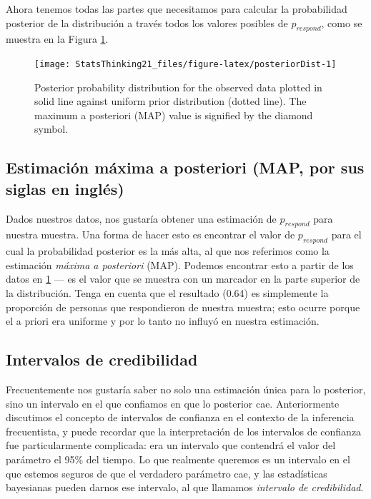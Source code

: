 \documentclass[
  12pt,
]{book}
\theoremstyle{definition}
\theoremstyle{definition}
\theoremstyle{definition}
\theoremstyle{remark}
\begin{document}
Ahora tenemos todas las partes que necesitamos para calcular la probabilidad posterior de la distribución a través todos los valores posibles de \(p_{respond}\), como se muestra en la Figura \ref{fig:posteriorDist}.

\begin{figure}
\texttt{[image: StatsThinking21\_files/figure-latex/posteriorDist-1]} \caption{Posterior probability distribution for the observed data plotted in solid line against uniform prior distribution (dotted line). The maximum a posteriori (MAP) value is signified by the diamond symbol.}\label{fig:posteriorDist}
\end{figure}

\hypertarget{estimaciuxf3n-muxe1xima-a-posteriori-map-por-sus-siglas-en-ingluxe9s}{%
\subsection{Estimación máxima a posteriori (MAP, por sus siglas en inglés)}\label{estimaciuxf3n-muxe1xima-a-posteriori-map-por-sus-siglas-en-ingluxe9s}}

Dados nuestros datos, nos gustaría obtener una estimación de \(p_{respond}\) para nuestra muestra. Una forma de hacer esto es encontrar el valor de \(p_{respond}\) para el cual la probabilidad posterior es la más alta, al que nos referimos como la estimación \emph{máxima a posteriori} (MAP). Podemos encontrar esto a partir de los datos en \ref{fig:posteriorDist} --- es el valor que se muestra con un marcador en la parte superior de la distribución. Tenga en cuenta que el resultado (0.64) es simplemente la proporción de personas que respondieron de nuestra muestra; esto ocurre porque el a priori era uniforme y por lo tanto no influyó en nuestra estimación.

\hypertarget{intervalos-de-credibilidad}{%
\subsection{Intervalos de credibilidad}\label{intervalos-de-credibilidad}}

Frecuentemente nos gustaría saber no solo una estimación única para lo posterior, sino un intervalo en el que confiamos en que lo posterior cae. Anteriormente discutimos el concepto de intervalos de confianza en el contexto de la inferencia frecuentista, y puede recordar que la interpretación de los intervalos de confianza fue particularmente complicada: era un intervalo que contendrá el valor del parámetro el 95\% del tiempo. Lo que realmente queremos es un intervalo en el que estemos seguros de que el verdadero parámetro cae, y las estadísticas bayesianas pueden darnos ese intervalo, al que llamamos \emph{intervalo de credibilidad}.
\end{document}
